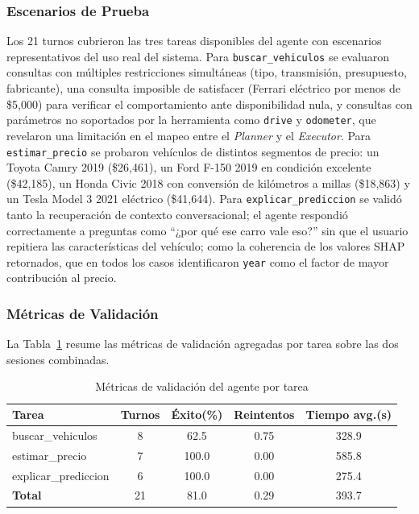 \documentclass[conference]{IEEEtran}
\begin{document}
\subsubsection{Escenarios de Prueba}
Los 21 turnos cubrieron las tres tareas disponibles del agente con escenarios representativos del uso real del sistema. Para \texttt{buscar\_vehiculos} se evaluaron consultas con múltiples restricciones simultáneas (tipo, transmisión, presupuesto, fabricante), una consulta imposible de satisfacer (Ferrari eléctrico por menos de \$5{,}000) para verificar el comportamiento ante disponibilidad nula, y consultas con parámetros no soportados por la herramienta como \texttt{drive} y \texttt{odometer}, que revelaron una limitación en el mapeo entre el \textit{Planner} y el \textit{Executor}. Para \texttt{estimar\_precio} se probaron vehículos de distintos segmentos de precio: un Toyota Camry 2019 (\$26{,}461), un Ford F-150 2019 en condición excelente (\$42{,}185), un Honda Civic 2018 con conversión de kilómetros a millas (\$18{,}863) y un Tesla Model 3 2021 eléctrico (\$41{,}644). Para \texttt{explicar\_prediccion} se validó tanto la recuperación de contexto conversacional; el agente respondió correctamente a preguntas como ``¿por qué ese carro vale eso?'' sin que el usuario repitiera las características del vehículo; como la coherencia de los valores SHAP retornados, que en todos los casos identificaron \texttt{year} como el factor de mayor contribución al precio.

\subsubsection{Métricas de Validación}
La Tabla~\ref{tab:metricas_agente} resume las métricas de validación agregadas por tarea sobre las dos sesiones combinadas.

\begin{table}[h]
    \centering
    \caption{Métricas de validación del agente por tarea }
    \label{tab:metricas_agente}
    \begin{tabular}{lcccc}
        \hline
        \textbf{Tarea} & \textbf{Turnos} & \textbf{Éxito(\%)} &
        \textbf{Reintentos} & \textbf{Tiempo avg.(s)} \\
        \hline
        {buscar\_vehiculos}    & 8 & 62.5  & 0.75 & 328.9 \\
        {estimar\_precio}      & 7 & 100.0 & 0.00 & 585.8 \\
        {explicar\_prediccion} & 6 & 100.0 & 0.00 & 275.4 \\
        \hline
        \textbf{Total}                & 21 & 81.0 & 0.29 & 393.7 \\
        \hline
    \end{tabular}
\end{table}
\end{document}
